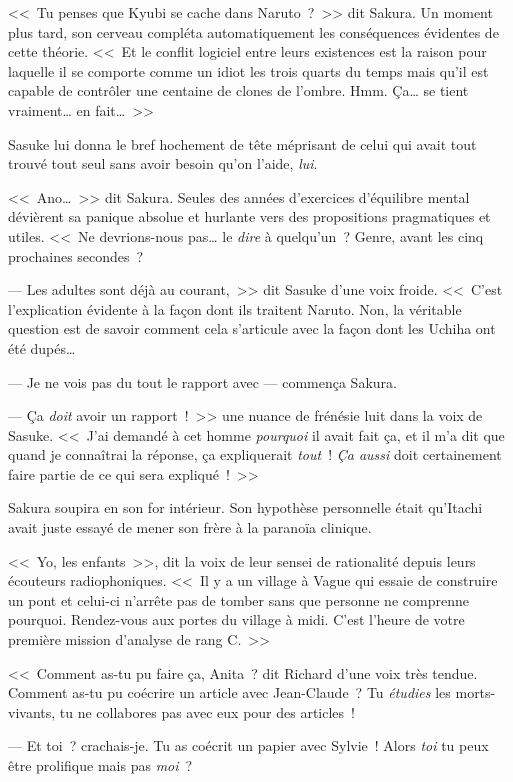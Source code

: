 <<~Tu penses que Kyubi se cache dans Naruto~?~>> dit Sakura. Un moment plus tard, son cerveau compléta automatiquement les conséquences évidentes de cette théorie. <<~Et le conflit logiciel entre leurs existences est la raison pour laquelle il se comporte comme un idiot les trois quarts du temps mais qu'il est capable de contrôler une centaine de clones de l'ombre. Hmm. Ça… se tient vraiment… en fait…~>>

Sasuke lui donna le bref hochement de tête méprisant de celui qui avait tout trouvé tout seul sans avoir besoin qu'on l'aide, \emph{lui}.

<<~Ano…~>> dit Sakura. Seules des années d'exercices d'équilibre mental dévièrent sa panique absolue et hurlante vers des propositions pragmatiques et utiles. <<~Ne devrions-nous pas… le \emph{dire} à quelqu'un~? Genre, avant les cinq prochaines secondes~?

--- Les adultes sont déjà au courant,~>> dit Sasuke d'une voix froide. <<~C'est l'explication évidente à la façon dont ils traitent Naruto. Non, la véritable question est de savoir comment cela s'articule avec la façon dont les Uchiha ont été dupés…

--- Je ne vois pas du tout le rapport avec — commença Sakura.

--- Ça \emph{doit} avoir un rapport~!~>> une nuance de frénésie luit dans la voix de Sasuke. <<~J'ai demandé à cet homme \emph{pourquoi} il avait fait ça, et il m'a dit que quand je connaîtrai la réponse, ça expliquerait \emph{tout}~! \emph{Ça aussi} doit certainement faire partie de ce qui sera expliqué~!~>>

Sakura soupira en son for intérieur. Son hypothèse personnelle était qu'Itachi avait juste essayé de mener son frère à la paranoïa clinique.

<<~Yo, les enfants~>>, dit la voix de leur sensei de rationalité depuis leurs écouteurs radiophoniques. <<~Il y a un village à Vague qui essaie de construire un pont et celui-ci n'arrête pas de tomber sans que personne ne comprenne pourquoi. Rendez-vous aux portes du village à midi. C'est l'heure de votre première mission d'analyse de rang C.~>>

\clearpage
{}

<<~Comment as-tu pu faire ça, Anita~? dit Richard d'une voix très tendue. Comment as-tu pu coécrire un article avec Jean-Claude~? Tu \emph{étudies} les morts-vivants, tu ne collabores pas avec eux pour des articles~!

--- Et toi~? crachais-je. Tu as coécrit un papier avec Sylvie~! Alors \emph{toi} tu peux être prolifique mais pas \emph{moi}~?

